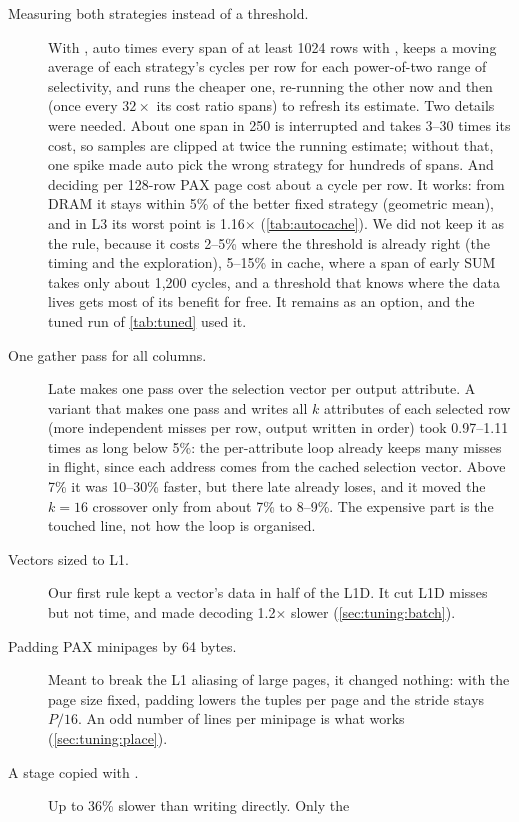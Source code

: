 
\begin{description}
\item[Measuring both strategies instead of a threshold.] With , auto times
every span of at least 1024 rows with , keeps a moving average of each strategy's
cycles per row for each power-of-two range of selectivity, and runs the cheaper one, re-running
the other now and then (once every $32\times$ its cost ratio spans) to refresh its estimate. Two
details were needed. About one span in 250 is interrupted and takes 3--30 times its cost, so
samples are clipped at twice the running estimate; without that, one spike made auto pick the
wrong strategy for hundreds of spans. And deciding per 128-row PAX page cost about a cycle per
row. It works: from DRAM it stays within 5\% of the better fixed strategy (geometric mean),
and in L3 its worst point is 1.16$\times$ (\cref{tab:autocache}). We did not keep it as the
rule, because it costs 2--5\% where the threshold is already right (the timing and the
exploration), 5--15\% in cache, where a span of early SUM takes only about 1{,}200 cycles, and
a threshold that knows where the data lives gets most of its benefit for free. It remains as an
option, and the tuned run of \cref{tab:tuned} used it.
\item[One gather pass for all columns.] Late makes one pass over the selection vector per
output attribute. A variant that makes one pass and writes all $k$ attributes of each selected
row (more independent misses per row, output written in order) took 0.97--1.11 times as long
below 5\%: the per-attribute loop already keeps many misses in flight, since each address comes
from the cached selection vector. Above 7\% it was 10--30\% faster, but there late already loses,
and it moved the $k{=}16$ crossover only from about 7\% to 8--9\%. The expensive part is the
touched line, not how the loop is organised.
\item[Vectors sized to L1.] Our first rule kept a vector's data in half of the L1D. It cut L1D
misses but not time, and made decoding 1.2$\times$ slower (\cref{sec:tuning:batch}).
\item[Padding PAX minipages by 64 bytes.] Meant to break the L1 aliasing of large pages, it
changed nothing: with the page size fixed, padding lowers the tuples per page and the stride
stays $P/16$. An odd number of lines per minipage is what works (\cref{sec:tuning:place}).
\item[A stage copied with .] Up to 36\% slower than writing directly. Only the

\end{description}
